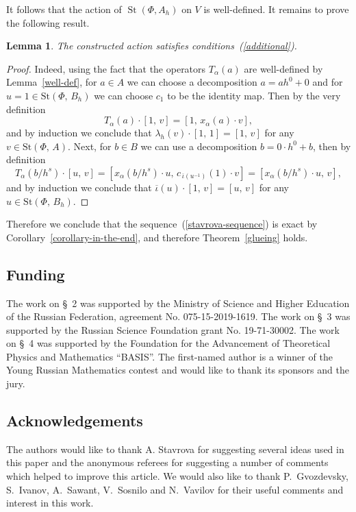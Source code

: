 \documentclass[oneside, 11pt]{amsart}
\numberwithin{equation}{section}
\newtheorem{lemma}{Lemma} \numberwithin{lemma}{section}
\newcommand{\St}{\mathop{\mathrm{St}}\nolimits}
\theoremstyle{definition}
\theoremstyle{definition}
\theoremstyle{remark}
\begin{document}
It follows that the action of $\St(\Phi, A_{h})$ on $V$ is well-defined. It remains to prove the following result.


\begin{lemma} The constructed action satisfies conditions~(\ref{additional}). 
\end{lemma}
\begin{proof}
Indeed, using the fact that the operators $T_\alpha(a)$ are well-defined by Lemma~\ref{well-def}, for $a\in A$ we can choose a decomposition $a=ah^0+0$ and for $u=1\in\mathrm{St}(\Phi,\,B_h)$ we can choose $c_{1}$ to be the identity map. Then by the very definition
$$
T_\alpha(a)\cdot[1,\,v]=[1,\,x_\alpha(a)\cdot v],
$$
and by induction we conclude that $\lambda_h(v)\cdot[1,\,1]=[1,\,v]$ for any $v\in\mathrm{St}(\Phi,\,A)$. Next, for $b\in B$ we can use a decomposition $b=0\cdot h^0+b$, then by definition
$$
T_\alpha(b/h^s)\cdot[u,\,v]=[x_\alpha(b/h^s)\cdot u,\,c_{\,\overline\iota(u^{-1})}(1)\cdot v]=[x_\alpha(b/h^s)\cdot u,\,v],
$$
and by induction we conclude that $\overline\iota(u)\cdot[1,\,v]=[u,\,v]$ for any $u\in\mathrm{St}(\Phi,\,B_h)$.
\end{proof}

Therefore we conclude that the sequence~(\ref{stavrova-sequence}) is exact by Corollary~\ref{corollary-in-the-end}, and therefore Theorem~\ref{glueing} holds.


\subsection*{Funding}
The work on \S~2 was supported by the Ministry of Science and Higher Education of the Russian Federation, agreement No. 075-15-2019-1619. The work on \S~3 was supported by the Russian Science Foundation grant No. 19-71-30002. The work on \S~4 was supported by the Foundation for the Advancement of Theoretical Physics and Mathematics ``BASIS''.
The first-named author is a winner of the Young Russian Mathematics contest and would like to thank its sponsors and the jury.

\subsection*{Acknowledgements}
 The authors would like to thank A. Stavrova for suggesting several ideas used in this paper and the anonymous referees for suggesting a number of comments which helped to improve this article. We would also like to thank P.~Gvozdevsky, S.~Ivanov, A.~Sawant, V.~Sosnilo and N.~Vavilov for their useful comments and interest in this work.
\end{document}
